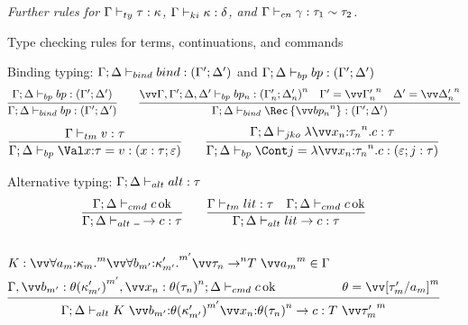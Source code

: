 \documentclass{article}
\begin{document}
\begin{figure}
\emph{Further rules for $\Gamma \vdash_{ty} \tau : \kappa$,
  $\Gamma \vdash_{ki} \kappa : \delta$, and
  $\Gamma \vdash_{cn} \gamma : \tau_1 \sim \tau_2$.}
\caption{Type checking rules for terms, continuations, and commands}
\label{fig:typing-rules}
\end{figure}

\begin{figure}
\centering

Binding typing: $\Gamma; \Delta \vdash_{bind} bind : (\Gamma'; \Delta')$ and
$\Gamma; \Delta \vdash_{bp} bp : (\Gamma'; \Delta')$
\begin{gather*}
  \infer
  {\typebind{\Gamma}{\Delta}{\nonrec{\bp}}{\Gamma'}{\Delta'}}
  {\typebp{\Gamma}{\Delta}{\bp}{\Gamma'}{\Delta'}}
  \qquad
  \infer
  {
    \typebind{\Gamma}{\Delta}{\rec{\vect[n]{\bp_n}}}{\Gamma'}{\Delta'}
  }
  {
    \vect[n]{
      \typebp
      {\Gamma,\Gamma'}{\Delta,\Delta'}
      {\bp_n}
      {\Gamma'_n}{\Delta'_n}
    }
    &
    \Gamma' = \vect[n]{\Gamma'_n}
    &
    \Delta' = \vect[n]{\Delta'_n}
  }
\end{gather*}
\begin{gather*}
  \infer
  {\typebp{\Gamma}{\Delta}{\bindv{\ann x \ty}{\tm}}{x:\ty}{\mt}}
  {\typetm{\Gamma}{\tm}{\ty}}
  \qquad
  \infer
  {
    \typebp
    {\Gamma}{\Delta}
    {\bindk{j}{\fnk{\vect[n]{\ann{x_n}{\ty_n}}}\cmd}}
    {\mt}{j:\ty}
  }
  {\typejmpko{\Gamma}{\Delta}{\fnk{\vect[n]{\ann{x_n}{\ty_n}}}\cmd}{\ty}}
\end{gather*}

Alternative typing: $\Gamma; \Delta \vdash_{alt} alt : \tau$
\begin{gather*}
  \infer
  {\typealt{\Gamma}{\Delta}{\alt{\blank}{\cmd}}{\ty}}
  {\typecmd{\Gamma}{\Delta}{\cmd}}
  \qquad
  \infer
  {\typealt{\Gamma}{\Delta}{\alt{\lit}{\cmd}}{\ty}}
  {
    \typetm{\Gamma}{\lit}{\ty}
    &
    \typecmd{\Gamma}{\Delta}{\cmd}
  }
  \\\\
  \infer
  {
    \typealt
    {\Gamma}{\Delta}
    {
      \alt{
        K ~ \vect[m']{\ann{b_{m'}}{\theta(\ki'_{m'})}} \vect[n]{\ann{x_{n}}{\theta(\ty_{n})}}
      }
      {\cmd}
    }
    {T ~ \vect[m]{\ty'_m}}
  }
  {
  \begin{aligned}[b]
    &
    K
    :
    \vect[m]{\forall\ann{a_m}{\ki_m}.} \vect[m']{\forall\ann{b_{m'}}{\ki'_{m'}}.}
      \vect[n]{\ty_{n} \to} T ~ \vect[m]{a_m}
    \in
    \Gamma
    \\
    &
    \typecmd
    {\Gamma, \vect[m']{b_{m'}:\theta(\ki'_{m'})}, \vect[n]{x_{n}:\theta(\ty_{n})}}
    {\Delta}
    {\cmd}
  \end{aligned}
    &
    \theta = \vect[m]{\subst{a_m}{\ty'_m}}
  }
\end{gather*}


\end{figure}
\end{document}
